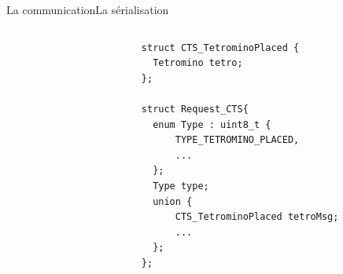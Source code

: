 \documentclass[french]{beamer}
\begin{document}
	    \begin{frame}[fragile]{La communication}{La sérialisation}
			\begin{columns}
		        \begin{column}{0.4\textwidth}
		        	\begin{scriptsize}
			    		\begin{verbatim}
						struct CTS_TetrominoPlaced {
						  Tetromino tetro;
						};

						struct Request_CTS{
						  enum Type : uint8_t {
						      TYPE_TETROMINO_PLACED,
						      ...
						  };
						  Type type;
						  union {
						      CTS_TetrominoPlaced tetroMsg;
						      ...
						  };
						};
						\end{verbatim}
					\end{scriptsize}
				\end{column}


\end{columns}
\end{frame}
\end{document}
